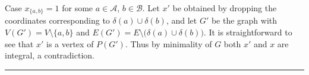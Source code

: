 \documentclass[preprint]{elsarticle}
\newenvironment{proof}{{\bf Proof:  }}{\hfill\rule{2mm}{2mm}}
\begin{document}
\begin{proof}
Case $x_{\{a,b\}}=1$ for some $a\in \mathcal{A}$, $b\in\mathcal{B}$. Let $x'$ be obtained by dropping the coordinates corresponding to $\delta(a)\cup\delta(b)$, and let $G'$ be the graph with $V(G')=V\setminus\{a,b\}$ and $E(G') = E \setminus \big(\delta(a)\cup\delta(b)\big)$. It is straightforward to see that $x'$ is a vertex of $P(G')$. Thus by minimality of $G$ both $x'$ and $x$ are integral, a contradiction. 
\end{proof}




\end{document}
